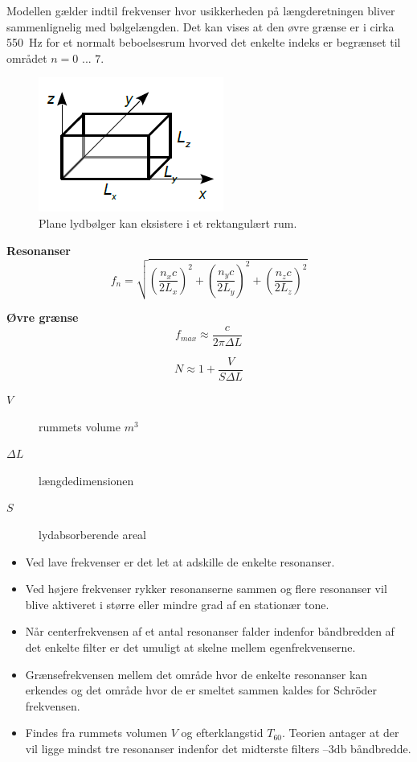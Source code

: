\noindent Modellen gælder indtil frekvenser hvor usikkerheden på længderetningen
bliver sammenlignelig med bølgelængden. 
Det kan vises at den øvre grænse er i cirka \SI{550}{\hertz} for
et normalt beboelsesrum hvorved det enkelte indeks er begrænset til området $n = 0$ ... $7$.

\begin{figure} [H]
	\centering
	\includegraphics[width=.4\linewidth]{graphics/13.png}
	\caption{Plane lydbølger kan eksistere i et rektangulært rum.}
	\label{fig:13}
\end{figure}
\noindent\textbf{Resonanser}
\begin{equation}
f_n = \sqrt{\left(\dfrac{n_x c}{2 L_x}\right)^2 + \left(\dfrac{n_y c}{2 L_y}\right)^2 + \left(\dfrac{n_z c}{2 L_z}\right)^2}
\end{equation}

\noindent\textbf{Øvre grænse}
\begin{equation}
f_{max}\approx \dfrac{c}{2\pi \Delta L}
\end{equation}

\begin{equation}
N \approx 1 +\dfrac{V}{S \Delta L}
\end{equation}

\begin{description}
	\item[$V$] rummets volume $m^3$
	\item[$\Delta L$] længdedimensionen
	\item[$S$] lydabsorberende areal
\end{description}
\newpage
\begin{itemize}
	\item Ved lave frekvenser er det let at adskille de enkelte resonanser.
	\item Ved højere frekvenser rykker resonanserne sammen og flere resonanser vil blive aktiveret i større eller mindre grad af en stationær tone. 
	\item Når centerfrekvensen af et antal	resonanser falder indenfor båndbredden af det enkelte filter er det umuligt at skelne mellem
	egenfrekvenserne.
	\item Grænsefrekvensen mellem det område hvor de enkelte resonanser kan erkendes og det område	hvor de er smeltet sammen kaldes for Schröder frekvensen. 
	\item Findes fra rummets volumen $V$ og efterklangstid $T_{60}$. Teorien antager at der vil ligge mindst	tre resonanser indenfor det midterste filters $–3 \si{\decibel}$ båndbredde.
\end{itemize}

